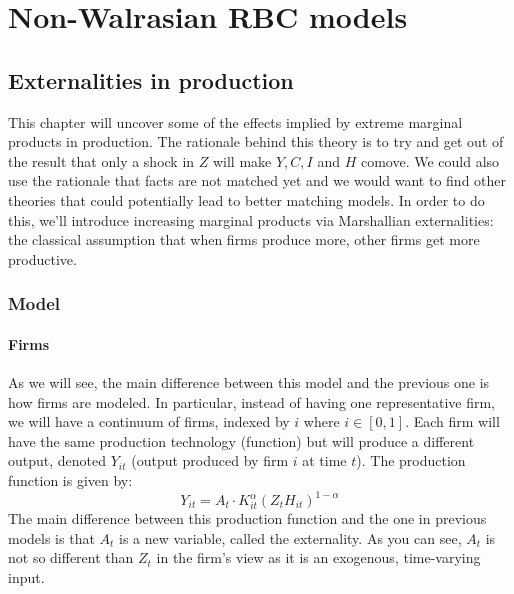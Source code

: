 \documentclass[12pt]{report}
\begin{document}
\chapter{Non-Walrasian RBC models}

\section{Externalities in production}

This chapter will uncover some of the effects implied by extreme marginal products in production. The rationale behind this theory is to try and get out of the result that only a shock in $Z$ will make $Y, C, I$ and $H$ comove. We could also use the rationale that facts are not matched yet and we would want to find other theories that could potentially lead to better matching models. In order to do this, we'll introduce increasing marginal products via Marshallian externalities: the classical assumption that when firms produce more, other firms get more productive. 

\subsection{Model}

\subsubsection{Firms} 

As we will see, the main difference between this model and the previous one is how firms are modeled. In particular, instead of having one representative firm, we will have a continuum of firms, indexed by $i$ where $i\in[0,1]$. Each firm will have the same production technology (function) but will produce a different output, denoted $Y_{it}$ (output produced by firm $i$ at time $t$). The production function is given by: $$ Y_{it} = A_t\cdot K_{it}^\alpha (Z_tH_{it})^{1-\alpha} $$ The main difference between this production function and the one in previous models is that $A_t$ is a new variable, called the externality. As you can see, $A_t$ is not so different than $Z_t$ in the firm's view as it is an exogenous, time-varying input. 
\end{document}
